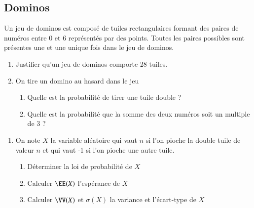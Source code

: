 \documentclass[oneside,12pt]{article}          %
\begin{document}
\subsection{Dominos}
\begin{minipage}{0.65\linewidth}
    Un jeu de dominos est composé de tuiles rectangulaires formant des paires de numéros entre 0 et 6 représentés par des points. Toutes les paires possibles sont présentes une et une unique fois dans le jeu de dominos.

    \begin{enumerate}
        \item Justifier qu'un jeu de dominos comporte 28 tuiles.
        \item On tire un domino au hasard dans le jeu
        \begin{enumerate}
            \item Quelle est la probabilité de tirer une tuile double ?
            \item Quelle est la probabilité que la somme des deux numéros soit un multiple de 3 ?
        \end{enumerate}
    \end{enumerate}
\end{minipage}\hfill
\begin{minipage}{0.3\linewidth}
\end{minipage}
\begin{enumerate}
    \item[3.] On note $X$ la variable aléatoire qui vaut $n$ si l'on pioche la double tuile de valeur $n$ et qui vaut -1 si l'on pioche une autre tuile.
    \begin{enumerate}
        \item Déterminer la loi de probabilité de $X$
        \item Calculer $\EE(X)$ l'espérance de $X$
        \item Calculer $\VV(X)$ et $\sigma(X)$ la variance et l'écart-type de $X$ 
    \end{enumerate} 
\end{enumerate}
\end{document}
